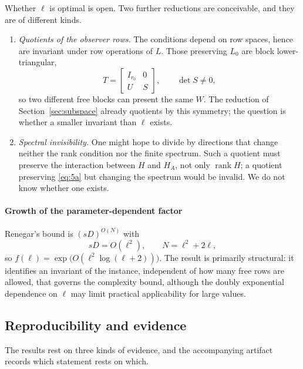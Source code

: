 \documentclass[journal]{IEEEtran}
\theoremstyle{plainn}
\theoremstyle{remark}
\begin{document}
Whether $\ell$ is optimal is open. Two further reductions are conceivable, and they are of
different kinds.

\begin{enumerate}
\item \emph{Quotients of the observer rows.} The conditions depend on row spaces, hence are
invariant under row operations of $L$. Those preserving $L_0$ are block lower-triangular,
\begin{equation*}
T=\begin{bmatrix}I_{r_0}&0\\ U&S\end{bmatrix},\qquad \det S\ne0 ,
\end{equation*}
so two different free blocks can present the same $W$. The reduction of
Section~\ref{sec:subspace} already quotients by this symmetry; the question is whether a
smaller invariant than $\ell$ exists.
\item \emph{Spectral invisibility.} One might hope to divide by directions that change neither
the rank condition nor the finite spectrum. Such a quotient must preserve the interaction
between $H$ and $H_A$, not only $\operatorname{rank}H$; a quotient preserving \eqref{eq:5a} but
changing the spectrum would be invalid. We do not know whether one exists.
\end{enumerate}

\paragraph*{Growth of the parameter-dependent factor}
Renegar's bound is $(sD)^{O(N)}$ with
\begin{equation*}
sD=O(\ell^2),\qquad N=\ell^2+2\ell ,
\end{equation*}
so $f(\ell)=\exp\bigl(O(\ell^2\log(\ell+2))\bigr)$. The result is primarily structural: it
identifies an invariant of the instance, independent of how many free rows are allowed, that
governs the complexity bound, although the doubly exponential dependence on $\ell$ may limit
practical applicability for large values.

\subsection{Reproducibility and evidence}\label{sec:repro}

The results rest on three kinds of evidence, and the accompanying artifact records which statement rests on which.
\end{document}
